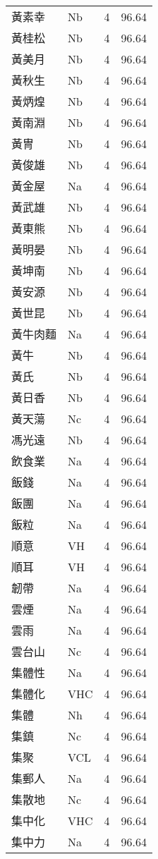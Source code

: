 \documentclass[twocolumn]{book}
\begin{document}
\begin{supertabular}{llrr}
黃素幸 & Nb & 4 &  96.64\\
黃桂松 & Nb & 4 &  96.64\\
黃美月 & Nb & 4 &  96.64\\
黃秋生 & Nb & 4 &  96.64\\
黃炳煌 & Nb & 4 &  96.64\\
黃南淵 & Nb & 4 &  96.64\\
黃冑 & Nb & 4 &  96.64\\
黃俊雄 & Nb & 4 &  96.64\\
黃金屋 & Na & 4 &  96.64\\
黃武雄 & Nb & 4 &  96.64\\
黃東熊 & Nb & 4 &  96.64\\
黃明晏 & Nb & 4 &  96.64\\
黃坤南 & Nb & 4 &  96.64\\
黃安源 & Nb & 4 &  96.64\\
黃世昆 & Nb & 4 &  96.64\\
黃牛肉麵 & Na & 4 &  96.64\\
黃牛 & Nb & 4 &  96.64\\
黃氏 & Nb & 4 &  96.64\\
黃日香 & Nb & 4 &  96.64\\
黃天蕩 & Nc & 4 &  96.64\\
馮光遠 & Nb & 4 &  96.64\\
飲食業 & Na & 4 &  96.64\\
飯錢 & Na & 4 &  96.64\\
飯團 & Na & 4 &  96.64\\
飯粒 & Na & 4 &  96.64\\
順意 & VH & 4 &  96.64\\
順耳 & VH & 4 &  96.64\\
韌帶 & Na & 4 &  96.64\\
雲煙 & Na & 4 &  96.64\\
雲雨 & Na & 4 &  96.64\\
雲台山 & Nc & 4 &  96.64\\
集體性 & Na & 4 &  96.64\\
集體化 & VHC & 4 &  96.64\\
集體 & Nh & 4 &  96.64\\
集鎮 & Nc & 4 &  96.64\\
集聚 & VCL & 4 &  96.64\\
集郵人 & Na & 4 &  96.64\\
集散地 & Nc & 4 &  96.64\\
集中化 & VHC & 4 &  96.64\\
集中力 & Na & 4 &  96.64\\

\end{supertabular}
\end{document}
